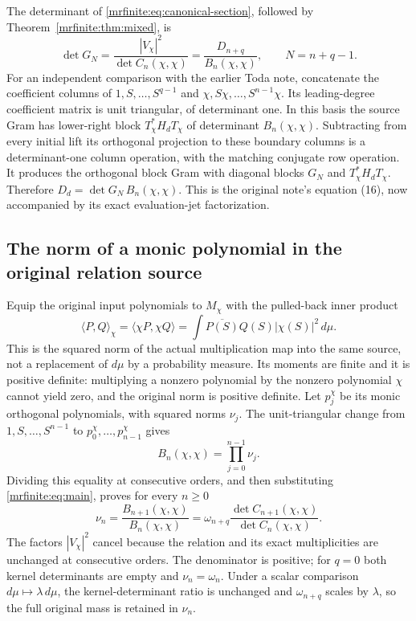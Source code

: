 \documentclass[11pt]{article}
\begin{document}
The determinant of \eqref{mrfinite:eq:canonical-section}, followed by
Theorem~\ref{mrfinite:thm:mixed}, is
\begin{equation}\label{mrfinite:eq:quotientdet}
 \boxed{\det G_N=\frac{|V_\chi|^2}{\det C_n(\chi,\chi)}
              =\frac{D_{n+q}}{B_n(\chi,\chi)},
       \qquad N=n+q-1.}
\end{equation}
For an independent comparison with the earlier Toda note, concatenate
the coefficient columns of
\(1,S,\ldots,S^{q-1}\) and
\(\chi,S\chi,\ldots,S^{n-1}\chi\).
Its leading-degree coefficient matrix is unit triangular, of determinant
one. In this basis the source Gram has lower-right block
\(T_\chi^*H_dT_\chi\) of determinant \(B_n(\chi,\chi)\).
Subtracting from every initial lift its orthogonal projection to these
boundary columns is a determinant-one column operation, with the
matching conjugate row operation. It produces the orthogonal block Gram
with diagonal blocks \(G_N\) and \(T_\chi^*H_dT_\chi\).
Therefore \(D_d=\det G_N\,B_n(\chi,\chi)\).
This is the original note's equation (16), now accompanied by its exact
evaluation-jet factorization.

\subsection{The norm of a monic polynomial in the original relation source}
\label{mrfinite:sec:relationnorm}

Equip the original input polynomials to \(M_\chi\) with the pulled-back
inner product
\[
 \langle P,Q\rangle_\chi=\langle\chi P,\chi Q\rangle
 =\int\overline{P(S)}Q(S)|\chi(S)|^2\,d\mu.
\]
This is the squared norm of the actual multiplication map into the same
source, not a replacement of \(d\mu\) by a probability measure. Its
moments are finite and it is positive definite: multiplying a nonzero
polynomial by the nonzero polynomial \(\chi\) cannot yield zero, and
the original norm is positive definite. Let \(p_j^\chi\) be its monic
orthogonal polynomials, with squared norms \(\nu_j\).
The unit-triangular change from \(1,S,\ldots,S^{n-1}\) to
\(p_0^\chi,\ldots,p_{n-1}^\chi\) gives
\[
 B_n(\chi,\chi)=\prod_{j=0}^{n-1}\nu_j.
\]
Dividing this equality at consecutive orders, and then substituting
\eqref{mrfinite:eq:main}, proves for every \(n\geq0\)
\begin{equation}\label{mrfinite:eq:relationnorm}
 \boxed{\nu_n=\frac{B_{n+1}(\chi,\chi)}{B_n(\chi,\chi)}
       =\omega_{n+q}
          \frac{\det C_{n+1}(\chi,\chi)}
               {\det C_n(\chi,\chi)}.}
\end{equation}
The factors \(|V_\chi|^2\) cancel because the relation and its exact
multiplicities are unchanged at consecutive orders. The denominator
is positive; for \(q=0\) both kernel determinants are empty and
\(\nu_n=\omega_n\). Under a scalar comparison
\(d\mu\mapsto\lambda\,d\mu\), the kernel-determinant ratio is
unchanged and \(\omega_{n+q}\) scales by \(\lambda\), so the full
original mass is retained in \(\nu_n\).
\end{document}
